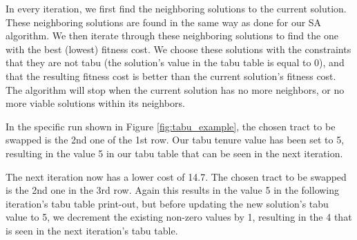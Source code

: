 \documentclass[journal]{IEEEtran}
\begin{document}
In every iteration, we first find the neighboring solutions to the current solution. These neighboring solutions are found in the same way as done for our SA algorithm. We then iterate through these neighboring solutions to find the one with the best (lowest) fitness cost. We choose these solutions with the constraints that they are not tabu (the solution's value in the tabu table is equal to 0), and that the resulting fitness cost is better than the current solution's fitness cost. The algorithm will stop when the current solution has no more neighbors, or no more viable solutions within its neighbors.

In the specific run shown in Figure \ref{fig:tabu_example}, the chosen tract to be swapped is the 2nd one of the 1st row. Our tabu tenure value has been set to 5, resulting in the value 5 in our tabu table that can be seen in the next iteration.

The next iteration now has a lower cost of 14.7. The chosen tract to be swapped is the 2nd one in the 3rd row. Again this results in the value 5 in the following iteration's tabu table print-out, but before updating the new solution's tabu value to 5, we decrement the existing non-zero values by 1, resulting in the 4 that is seen in the next iteration's tabu table.
 \\
\end{document}
